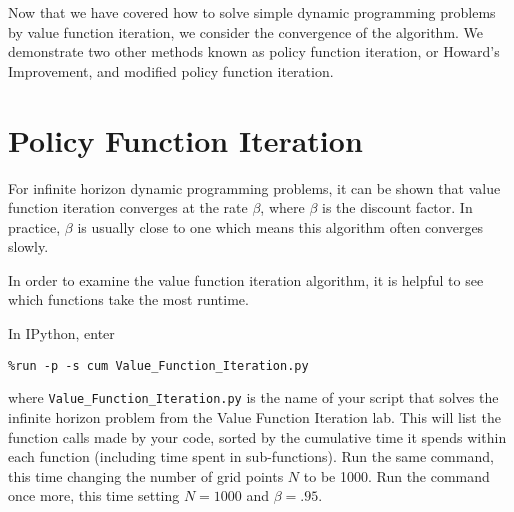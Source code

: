 
Now that we have covered how to solve simple dynamic programming problems by value function iteration, we consider the convergence of the algorithm.  We demonstrate two other methods known as policy function iteration, or Howard's Improvement, and modified policy function iteration.

\section*{Policy Function Iteration}
For infinite horizon dynamic programming problems, it can be shown that value function iteration converges at the rate $\beta$, where $\beta$ is the discount factor.  In practice, $\beta$ is usually close to one which means this algorithm often converges slowly.  

In order to examine the value function iteration algorithm, it is helpful to see which functions take the most runtime.
\begin{problem}
\label{prob:profile}
In IPython, enter
\begin{lstlisting}
%run -p -s cum Value_Function_Iteration.py
\end{lstlisting}
where \texttt{Value\_Function\_Iteration.py} is the name of your script that solves the infinite horizon problem from the Value Function Iteration lab.  This will list the function calls made by your code, sorted by the cumulative time it spends within each function (including time spent in sub-functions).
Run the same command, this time changing the number of grid points $N$ to be 1000.
Run the command once more, this time setting $N=1000$ and $\beta = .95$.
\end{problem}

